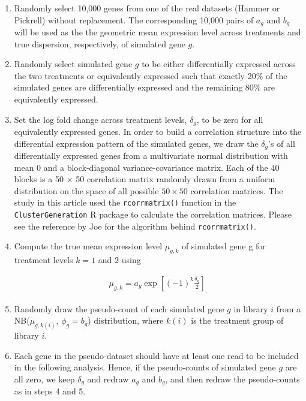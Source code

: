 \documentclass[10pt]{article}
\begin{document}
\begin{enumerate}
\item Randomly select 10,000 genes from one of the real datasets (Hammer or Pickrell) without replacement. The corresponding 10,000 pairs of $a_g$ and $b_g$ will be used as the the geometric mean expression level across treatments and true dispersion, respectively, of simulated gene $g$.
\item Randomly select simulated gene $g$ to be either differentially expressed %
across the two treatments or equivalently expressed %
 such that exactly 20\% of the simulated genes are differentially expressed %
 and the remaining 80\% are equivalently expressed. %
\item Set the log fold change across treatment levels, $\delta_g$, to be zero for all equivalently expressed %
 genes. In order to build a correlation structure into the differential expression pattern of the simulated genes, we draw the $\delta_g$'s of all differentially expressed %
 genes from a multivariate normal distribution with mean 0 and a block-diagonal variance-covariance matrix. Each of the 40 blocks is a 50 $\times$ 50 correlation matrix randomly drawn from a uniform distribution on the space of all possible $50 \times 50$ correlation matrices. The study in this article used the {\tt rcorrmatrix()} function in the {\tt ClusterGeneration} R package to calculate the correlation matrices. Please see the reference by Joe \cite{joe} for the algorithm behind {\tt rcorrmatrix()}.

\item Compute the true mean expression level $\mu_{g, k}$ of simulated gene g for treatment levels $k = 1$ and $2$ using

\begin{align*}
\mu_{g, k} = a_g \exp \left [ (-1)^k \frac{\delta_g}{2} \right ]_. %
\end{align*}

\item Randomly draw the pseudo-count of each simulated gene $g$ in library $i$ from a NB($\mu_{g, k(i)}$, ${\phi}_{g} = b_g$) distribution, where $k(i)$ is the treatment group of library $i$.
\item Each gene in the pseudo-dataset should have at least one read to be included in the following analysis. Hence, if the pseudo-counts of simulated gene $g$ are all zero, we keep $\delta_g$ and redraw $a_g$ and $b_g$, and then redraw the pseudo-counts as in steps 4 and 5.
\end{enumerate}
\end{document}
